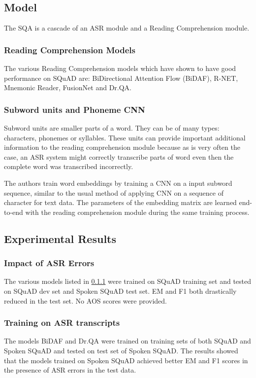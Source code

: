 \documentclass[a4paper]{article}
\begin{document}
\subsection{Model}
The SQA is a cascade of an ASR module and a Reading Comprehension module.

\subsubsection{Reading Comprehension Models} \label{rcmodels}
The various Reading Comprehension models which have shown to have good performance on SQuAD are: BiDirectional Attention Flow (BiDAF), R-NET, Mnemonic Reader, FusionNet and Dr.QA.

\subsubsection{Subword units and Phoneme CNN}
Subword units are smaller parts of a word. They can be of many types: characters, phonemes or syllables. These units can provide important additional information to the reading comprehension module because as is very often the case, an ASR system might correctly transcribe parts of word even then the complete word was transcribed incorrectly.

The authors train word embeddings by training a CNN on a input subword sequence, similar to the usual method of applying CNN on a sequence of character for text data. The parameters of the embedding matrix are learned end-to-end with the reading comprehension module during the same training process.

\subsection{Experimental Results}

\subsubsection{Impact of ASR Errors}
The various models listed in \ref{rcmodels} were trained on SQuAD training set and tested on SQuAD dev set and Spoken SQuAD test set. EM and F1 both drastically reduced in the test set. No AOS scores were provided.

\subsubsection{Training on ASR transcripts}
The models BiDAF and Dr.QA were trained on training sets of both SQuAD and Spoken SQuAD and tested on test set of Spoken SQuAD. The results showed that the models trained on Spoken SQuAD achieved better EM and F1 scores in the presence of ASR errors in the test data.
\end{document}
